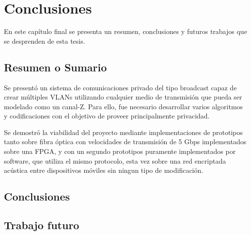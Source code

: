 \chapter{Conclusiones}
En este capítulo final se presenta un resumen, conclusiones y futuros trabajos que se desprenden de esta tesis.

\section{Resumen o Sumario}

Se presentó un sistema de comunicaciones privado del tipo broadcast capaz de crear múltiples VLANs utilizando cualquier medio de transmisión que pueda ser modelado como un canal-Z.
Para ello, fue necesario desarrollar varios algoritmos y codificaciones con el objetivo de proveer principalmente privacidad.

Se demostró la viabilidad del proyecto mediante implementaciones de prototipos tanto sobre fibra óptica con velocidades de transmisión de 5 Gbps implementados sobre una FPGA, y con un segundo prototipos puramente implementados por software, que utiliza el mismo protocolo, esta vez sobre una red encriptada acústica entre dispositivos móviles sin ningun tipo de modificación.

\section{Conclusiones}

\section{Trabajo futuro}

